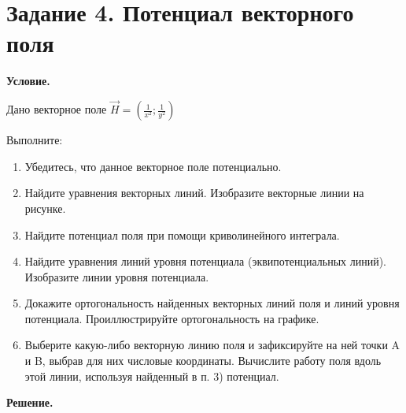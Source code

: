 \section{Задание 4. Потенциал векторного поля}

\textbf{Условие.}

Дано векторное поле $\overrightarrow{H} = \left(\frac{1}{x^2}; \frac{1}{y^2}\right)$

Выполните:
\begin{enumerate}
    \item Убедитесь, что данное векторное поле потенциально.

    \item Найдите уравнения векторных линий. Изобразите векторные линии на рисунке.

    \item Найдите потенциал поля при помощи криволинейного интеграла.

    \item Найдите уравнения линий уровня потенциала (эквипотенциальных линий). Изобразите линии уровня потенциала.

    \item Докажите ортогональность найденных векторных линий поля и линий уровня потенциала. Проиллюстрируйте ортогональность на графике.

    \item Выберите какую-либо векторную линию поля и зафиксируйте на ней точки A и B, выбрав для них числовые координаты. Вычислите работу поля вдоль этой линии, используя найденный в п. 3) потенциал.


\end{enumerate}

\vspace{10mm}
\textbf{Решение.}


